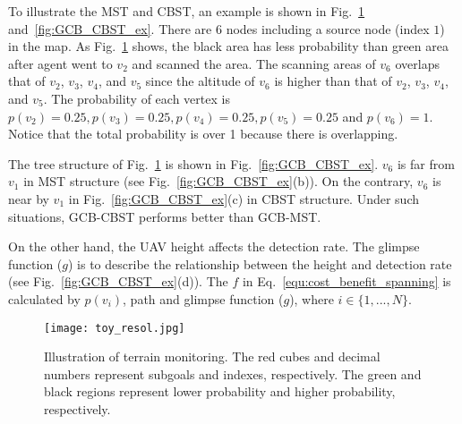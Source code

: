 To illustrate the MST and CBST, an example is shown in Fig.~\ref{fig:ex_epd} and~\ref{fig:GCB_CBST_ex}.
There are $6$ nodes including a source node (index $1$) in the map.
As Fig.~\ref{fig:ex_epd} shows, the black area has less probability than green area after agent went to $v_2$ and scanned the area.
The scanning areas of $v_6$ overlaps that of $v_2$, $v_3$, $v_4$, and $v_5$ since the altitude of $v_6$ is higher than that of $v_2$, $v_3$, $v_4$, and $v_5$.
The probability of each vertex is $p(v_2)=0.25, p(v_3)=0.25, p(v_4)=0.25, p(v_5)=0.25$ and $p(v_6)=1.$
Notice that the total probability is over 1 because there is overlapping.

The tree structure of Fig.~\ref{fig:ex_epd} is shown in Fig.~\ref{fig:GCB_CBST_ex}.
$v_6$ is far from $v_1$ in MST structure (see Fig.~\ref{fig:GCB_CBST_ex}(b)).
On the contrary, $v_6$ is near by $v_1$ in Fig.~\ref{fig:GCB_CBST_ex}(c) in CBST structure.
Under such situations, GCB-CBST performs better than GCB-MST.


On the other hand, the UAV height affects the detection rate.
The glimpse function ($g$) is to describe the relationship between the height and detection rate (see Fig.~\ref{fig:GCB_CBST_ex}(d)).
The $f$ in Eq.~\ref{equ:cost_benefit_spanning} is calculated by $p(v_i)$, path and glimpse function ($g$), where $i \in \{1,...,N\}.$



\begin{figure}[htbp]
 \begin{center}
\texttt{[image: toy\_resol.jpg]}
\caption{Illustration of terrain monitoring.
The red cube{\color{olive}s} and decimal numbers represent subgoals and indexes, respectively.
The green and black regions represent lower probability and higher probability, respectively.
}
\label{fig:ex_epd}
 \end{center}
 \end{figure}

